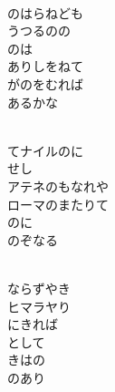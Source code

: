 \documentclass[10pt,b5j]{tarticle} %
\begin{document}
\vspace{1.5em} %
\newcommand{\linespace}{0.5em} %
\newcommand{\blocksize}{0.5\hsize} %
\newcommand{\itemmargin}{6em} %
\begin{enumerate} %
    \setlength{\itemindent}{\itemmargin} %
    \begin{minipage}[c]{\blocksize}
    
        \vspace{\linespace}
        \item~\\
        のはらねども\\
        うつるのの\\
        のは\\
        ありしをねて\\
        がのをむれば\\
        あるかな
        
        \vspace{\linespace}
        \item~\\
        てナイルのに\\
        せし\\
        アテネのもなれや\\
        ローマのまたりて\\
        のに\\
        のぞなる
        
        \vspace{\linespace}
        \item~\\
        ならずやき\\
        ヒマラヤり\\
        にきれば\\
        として\\
        きはの\\
        のあり
        

\end{minipage}
\end{enumerate}
\end{document}
